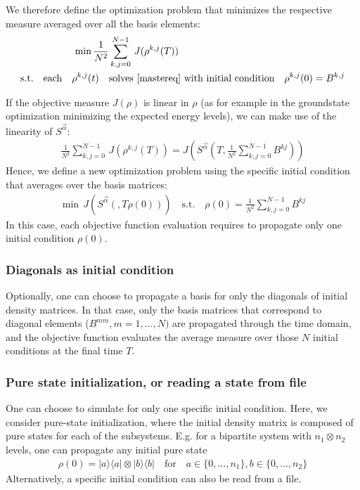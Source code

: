 \documentclass[letterpaper]{article}
\begin{document}
We therefore define the optimization problem that minimizes the respective
measure averaged over all the basis elements:
\begin{align}\label{optimproblem_basis}
  \min \frac{1}{N^2} & \sum_{k,j=0}^{N-1} \, J(\rho^{k,j}(T))  \\
  \text{s.t.} \quad  \text{each} \quad \rho^{k,j}(t) \quad & \text{solves
  \eqref{mastereq} with initial condition} \quad \rho^{k,j}(0) = B^{k,j}
\end{align}

If the objective measure $J(\rho)$ is linear in $\rho$ (as for example in the
groundstate optimization minimizing the expected energy levels), we can make use
of the linearity of $S^{\vec{\alpha}}$:
\begin{align}
   \frac{1}{N^2}  \sum_{k,j=0}^{N-1} \, J\left(\rho^{k,j}(T)\right) =
   J\left(S^{\vec{\alpha}}\left(T,\frac{1}{N^2}  \sum_{k,j=0}^{N-1}
   B^{kj}\right)\right)
\end{align}
Hence, we define a new optimization problem using the specific initial condition
that averages over the basis matrices:
\begin{align}
  \min \, J(S^{\vec{\alpha}}(,T\rho(0))) \quad \text{s.t.} \quad \rho(0) =
  \frac{1}{N^2}  \sum_{k,j=0}^{N-1} B^{kj}
\end{align}
In this case, each objective function evaluation requires to propagate only one
initial condition $\rho(0)$. 

\subsubsection{Diagonals as initial condition}
Optionally, one can choose to propagate a basis for only the diagonals of
initial density matrices. In that case, only the basis matrices that correspond
to diagonal elements ($B^{mm}, m=1,\dots,N)$ are propagated through the time
domain, and the objective function evaluates the average measure over those $N$
initial conditions at the final time $T$. 

\subsubsection{Pure state initialization, or reading a state from file}
One can choose to simulate for only one specific initial condition. Here, we
consider pure-state initialization, where the initial density matrix is composed
of pure states for each of the subsystems. E.g. for a bipartite system with $n_1
\otimes n_2$ levels, one can propagate any initial pure state 
\begin{align}
  \rho(0)  = |a\rangle \langle a| \otimes |b\rangle \langle b| \quad \text{for} \quad a \in \{0,\dots, n_1\}, b\in \{0,\dots, n_2\}
\end{align}
Alternatively, a specific initial condition can also be read from a file. 
\end{document}
